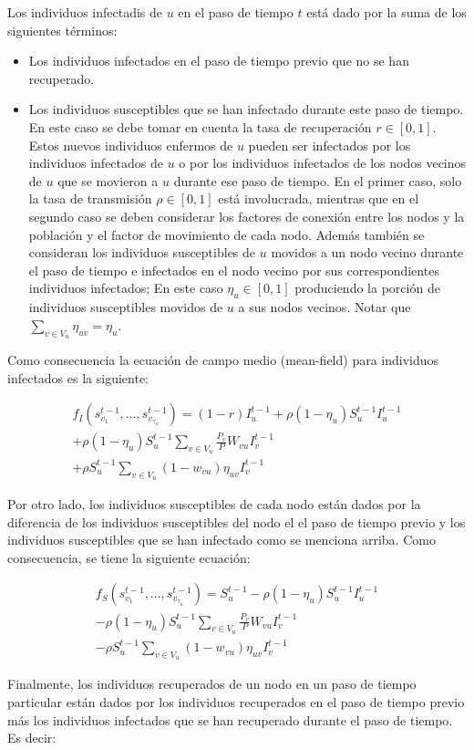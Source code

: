 Los individuos infectadis de $u$ en el paso de tiempo $t$ está dado por la suma de los siguientes términos:

\begin{itemize}
	\item Los individuos infectados en el paso de tiempo previo que no se han recuperado.
	
	\item Los individuos susceptibles que se han infectado durante este paso de tiempo. En este caso se debe tomar en cuenta la tasa de recuperación $r \in [0, 1]$. Estos nuevos individuos enfermos de $u$ pueden ser infectados por los individuos infectados de $u$ o por los individuos infectados de los nodos vecinos de $u$ que se movieron a $u$ durante ese paso de tiempo. En el primer caso, solo la tasa de transmisión $\rho \in [0, 1]$ está involucrada, mientras que en el segundo caso se deben considerar los factores de conexión entre los nodos y la población y el factor de movimiento de cada nodo. Además también se consideran los individuos susceptibles de $u$ movidos a un nodo vecino durante el paso de tiempo e infectados en el nodo vecino por sus correspondientes individuos infectados; En este caso $\eta_{u} \in [0, 1]$ produciendo la porción de individuos susceptibles movidos de $u$ a sus nodos vecinos. Notar que $\sum_{v \in V_{u}}^{} \eta_{u v} = \eta_{u}$.
\end{itemize}	
	Como consecuencia la ecuación de campo medio (mean-field) para individuos infectados es la siguiente:
	
	\begin{equation}
		\begin{split}
			f_{I}(s_{v_1}^{t-1},...,s_{v_{\gamma_u} }^{t-1}) = (1 - r) I_{u}^{t-1} + \rho (1 - \eta_{u}) S_{u}^{t-1} I_{u}^{t-1} \\ 
			+ \rho (1 - \eta_{u}) S_{u}^{t-1} \sum_{v \in V_{u}}^{} \frac{P_{v}} { P } W_{v u}  I_{v} ^ {t-1} \\
			+ \rho S_{u}^{t-1} \sum_{v \in V_{u}}^{} (1 - w_{v u}  ) \eta_{u v } I_{v}^{t-1}
		\end{split}
	\end{equation}
	
	Por otro lado, los individuos susceptibles de cada nodo están dados por la diferencia de los individuos susceptibles del nodo el el paso de tiempo previo y los individuos susceptibles que se han infectado como se menciona arriba. Como consecuencia, se tiene la siguiente ecuación:
	
	\begin{equation}
	\begin{split}
	f_{S}(s_{v_1}^{t-1},...,s_{v_{\gamma_u} }^{t-1}) =  S_{u}^{t-1} - \rho (1 - \eta_{u}) S_{u}^{t-1} I_{u}^{t-1} \\ 
- \rho (1 - \eta_{u}) S_{u}^{t-1} \sum_{v \in V_{u}}^{} \frac{P_{v}} { P } W_{v u}  I_{v} ^ {t-1} \\
	- \rho S_{u}^{t-1} \sum_{v \in V_{u}}^{} (1 - w_{v u}  ) \eta_{u v } I_{v}^{t-1}
	\end{split}
	\end{equation}
	

Finalmente, los individuos recuperados de un nodo en un paso de tiempo particular están dados por los individuos recuperados en el paso de tiempo previo más los individuos infectados que se han recuperado durante el paso de tiempo. Es decir:





